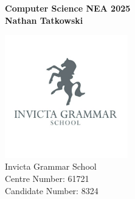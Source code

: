 \documentclass[11pt]{article}
\begin{document}
    \pagestyle{fancy}
    \setlength{\headheight}{13.6pt}

    \begin{titlepage}
        \begin{center}
            \vspace*{1cm}
            \Huge
            \textbf{Computer Science NEA 2025} \\
            \vspace*{2cm}
            \LARGE
            \textbf{Nathan Tatkowski}

            \vfill
            \includegraphics*[width=0.4\textwidth]{figures/igsLogo.jpg} \\
            \Large
            Invicta Grammar School \\
            Centre Number: 61721 \\
            Candidate Number: 8324
        \end{center}
    \end{titlepage}

    \tableofcontents

    \newpage
    \listoffigures

    \newpage
    \listoftables

    \newpage
    \lstlistoflistings

    \newpage


    

    

    

    

    

    \appendix
    
    
    
    
\end{document}
